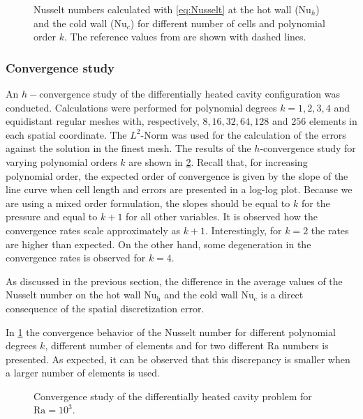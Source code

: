 
\begin{figure}[b!]
	\centering
	\caption{Nusselt numbers calculated with \cref{eq:Nusselt} at the hot wall ($\text{Nu}_h$) and the cold wall ($\text{Nu}_c$) for different number of cells and polynomial order $k$. The reference values from \cite{vierendeelsBenchmarkSolutionsNatural2003} are shown with dashed lines.}\label{fig:NusseltStudy}
\end{figure}

\subsubsection{Convergence study}\label{ssec:ConvStudyHeatedCavity}
An $h-$convergence study of the differentially heated cavity configuration was conducted. Calculations were performed for polynomial degrees $k = {1,2,3,4}$ and equidistant regular meshes with, respectively, $8, 16, 32, 64, 128$ and $256$ elements in each spatial coordinate.  The $L^2$-Norm was used for the calculation of the errors against the solution in the finest mesh. The results of the $h$-convergence study for varying polynomial orders $k$ are shown in \cref{fig:ConvergenceDHC}. Recall that, for increasing polynomial order, the expected order of convergence is given by the slope of the line curve when cell length and errors are presented in a log-log plot. Because we are using a mixed order formulation, the slopes should be equal to $k$ for the pressure and equal to $k+1$ for all other variables.  It is observed how the convergence rates scale approximately as $k+1$. Interestingly, for $k=2$ the rates are higher than expected. On the other hand, some degeneration in the convergence rates is observed for $k = 4$.

As discussed in the previous section, the difference in the average values of the Nusselt number on the hot wall $\text{Nu}_\text{h}$  and the cold wall $\text{Nu}_\text{c}$ is a direct consequence of the spatial discretization error.

In \cref{fig:NusseltStudy} the convergence behavior of the Nusselt number for different polynomial degrees $k$, different number of elements and for two different Ra numbers is presented. As expected, it can be observed that this discrepancy is smaller when a larger number of elements is used.


\begin{figure}[t!]
	\centering
	\pgfplotsset{width=0.34\textwidth, compat=1.3}
	\caption{Convergence study of the differentially heated cavity problem for $\text{Ra} = 10^3$.}\label{fig:ConvergenceDHC}
\end{figure}

\FloatBarrier
